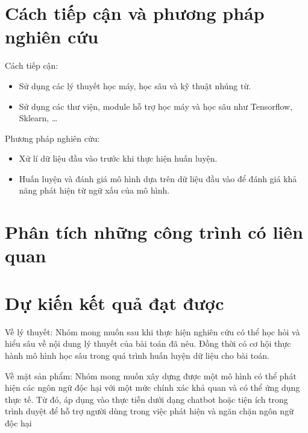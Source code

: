 \section{Cách tiếp cận và phương pháp nghiên cứu}
Cách tiếp cận:
\begin{itemize}
    \item Sử dụng các lý thuyết học máy, học sâu và kỹ thuật nhúng từ.
    \item Sử dụng các thư viện, module hỗ trợ học máy và học sâu như Tensorflow, Sklearn, \dots
\end{itemize}

Phương pháp nghiên cứu:
\begin{itemize}
    \item Xử lí dữ liệu đầu vào trước khi thực hiện huấn luyện.
    \item Huấn luyện và đánh giá mô hình dựa trên dữ liệu đầu vào để đánh giá khả năng phát hiện từ ngữ xấu của mô hình.
\end{itemize}

\section{Phân tích những công trình có liên quan}

\section{Dự kiến kết quả đạt được}
Về lý thuyết: Nhóm mong muốn sau khi thực hiện nghiên cứu có thể học hỏi và hiểu sâu về nội dung lý thuyết của bài toán đã nêu. Đồng thời có cơ hội thực hành mô hình học sâu trong quá trình huấn luyện dữ liệu cho bài toán.

Về mặt sản phẩm: Nhóm mong muốn xây dựng được một mô hình có thể phát hiện các ngôn ngữ độc hại với một mức chính xác khả quan và có thể ứng dụng thực tế. Từ đó, áp dụng vào thực tiễn dưới dạng chatbot hoặc tiện ích trong trình duyệt để hỗ trợ người dùng trong việc phát hiện và ngăn chặn ngôn ngữ độc hại

